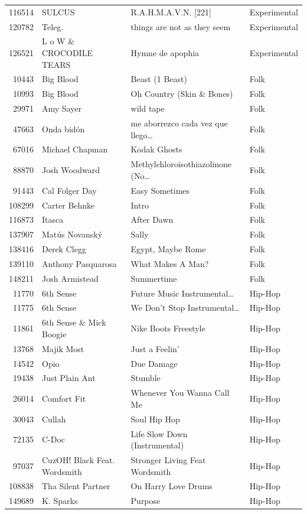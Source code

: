 \begin{footnotesize}
\begin{longtable}{@{}rlll@{}}
116514 & SULCUS & R.A.H.M.A.V.N. [221] & Experimental \\
120782 & Teleg. & things are not as they seem & Experimental \\
126521 & L o W \& CROCODILE TEARS & Hymne de apophia & Experimental \\
10443 & Big Blood & Beast (1 Beast) & Folk \\
10993 & Big Blood & Oh Country (Skin \& Bones) & Folk \\
29971 & Amy Sayer & wild tape & Folk \\
47663 & Onda bidón & me aborrezco cada vez que llego\ldots & Folk \\
67016 & Michael Chapman & Kodak Ghosts & Folk \\
88870 & Josh Woodward & Methylchloroisothiazolinone (No\ldots & Folk \\
91443 & Cal Folger Day & Easy Sometimes & Folk \\
108299 & Carter Behnke & Intro & Folk \\
116873 & Itasca & After Dawn & Folk \\
137907 & Matús Novanský & Sally & Folk \\
138416 & Derek Clegg & Egypt, Maybe Rome & Folk \\
139110 & Anthony Pasquarosa & What Makes A Man? & Folk \\
148211 & Josh Armistead & Summertime & Folk \\
11770 & 6th Sense & Future Music Instrumental\ldots & Hip-Hop \\
11775 & 6th Sense & We Don't Stop Instrumental\ldots & Hip-Hop \\
11861 & 6th Sense \& Mick Boogie & Nike Boots Freestyle & Hip-Hop \\
13768 & Majik Most & Just a Feelin' & Hip-Hop \\
14542 & Opio & Due Damage & Hip-Hop \\
19438 & Just Plain Ant & Stumble & Hip-Hop \\
26014 & Comfort Fit & Whenever You Wanna Call Me & Hip-Hop \\
30043 & Cullah & Soul Hip Hop & Hip-Hop \\
72135 & C-Doc & Life Slow Down (Instrumental) & Hip-Hop \\
97037 & CuzOH! Black Feat. Wordsmith & Stronger Living Feat Wordsmith & Hip-Hop \\
108838 & Tha Silent Partner & On Harry Love Drums & Hip-Hop \\
149689 & K. Sparks & Purpose & Hip-Hop \\

\end{longtable}
\end{footnotesize}
